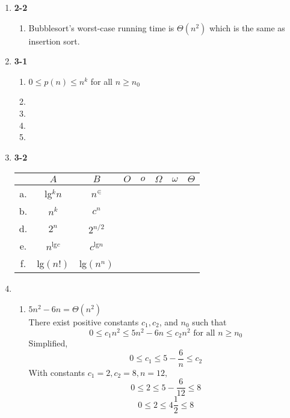 \documentclass[a4paper]{article}
\begin{document}
\begin{enumerate}
        \item
        \textbf{2-2}
        \begin{enumerate}[label=d)]
        
            \item Bubblesort's worst-case running time is $\Theta(n^{2})$ which is 
            the same as insertion sort.
        
        \end{enumerate}
    
        \item
        \textbf{3-1}
        \begin{enumerate}[label=\alph*)]
            \item $0 \leq p(n) \leq n^{k}$ for all $n \geq n_0$


            \item


            \item


            \item


            \item

        \end{enumerate}

        \item
        \textbf{3-2}\\
        \begin{tabular}{ ccc|c|c|c|c|c|}
           & $A$ & $B$ & $O$ & $o$ & $\Omega$ & $\omega$ & $\Theta$\\ \hline
        a. & lg$^{k}n$ & $n^{\in}$ &  &  &  &  & \\ \hline
        b. & $n^{k}$ & $c^{n}$ &  &  &  &  & \\ \hline
        d. & $2^{n}$ & $2^{n/2}$ &  &  &  &  & \\ \hline
        e. & $n^{\text{lg}c}$ & $c^{\text{lg}n}$ &  &  &  &  & \\ \hline
        f. & lg$(n!)$ & lg$(n^{n})$ &  &  &  &  & \\ \hline
        \end{tabular}

        \newpage

        \item
        \begin{enumerate}[label=\alph*)]
            
            \item $5n^{2}-6n=\Theta(n^{2})$ \\
            There exist positive constants $c_1, c_2$, and $n_0$ such that 
            $$0 \leq c_1n^{2} \leq 5n^{2}-6n \leq c_2n^{2} \text{ for all } n \geq n_0$$
            Simplified,
            $$0 \leq c_1 \leq 5-\frac{6}{n} \leq c_2$$
            With constants $c_1 = 2, c_2 = 8, n = 12,$
            $$0 \leq 2 \leq 5-\frac{6}{12} \leq 8$$
            $$0 \leq 2 \leq 4\frac{1}{2} \leq 8$$


\end{enumerate}
\end{enumerate}
\end{document}
